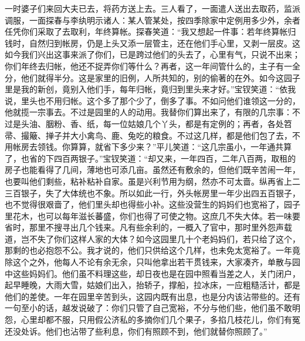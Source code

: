 \begin{parag}
    一时婆子们来回大夫已去，将药方送上去。三人看了，一面遣人送出去取药，监派调服，一面探春与李纨明示诸人：某人管某处，按四季除家中定例用多少外，余者任凭你们采取了去取利，年终算帐。探春笑道：“我又想起一件事：若年终算帐归钱时，自然归到帐房，仍是上头又添一层管主，还在他们手心里，又剥一层皮。这如今我们兴出这事来派了你们，已是跨过他们的头去了，心里有气，只说不出来；你们年终去归帐，他还不捉弄你们等什么？再者，这一年间管什么的，主子有一全分，他们就得半分。这是家里的旧例，人所共知的，别的偷著的在外。如今这园子里是我的新创，竟别入他们手，每年归帐，竟归到里头来才好。”宝钗笑道：“依我说，里头也不用归帐。这个多了那个少了，倒多了事。不如问他们谁领这一分的，他就揽一宗事去。不过是园里的人的动用。我替你们算出来了，有限的几宗事：不过是头油、胭粉、香、纸，每一位姑娘几个丫头，都是有定例的；再者，各处笤帚、撮簸、掸子并大小禽鸟、鹿、兔吃的粮食。不过这几样，都是他们包了去，不用帐房去领钱。你算算，就省下多少来？”平儿笑道：“这几宗虽小，一年通共算了，也省的下四百两银子。”宝钗笑道：“却又来，一年四百，二年八百两，取租的房子也能看得了几间，薄地也可添几亩。虽然还有敷余的，但他们既辛苦闹一年，也要叫他们剩些，粘补粘补自家。虽是兴利节用为纲，然亦不可太啬。纵再省上二三百银子，失了大体统也不象。所以如此一行，外头帐房里一年少出四五百银子，也不觉得很艰啬了，他们里头却也得些小补。这些没营生的妈妈们也宽裕了，园子里花木，也可以每年滋长蕃盛，你们也得了可使之物。这庶几不失大体。若一味要省时，那里不搜寻出几个钱来。凡有些余利的，一概入了官中，那时里外怨声载道，岂不失了你们这样人家的大体？如今这园里几十个老妈妈们，若只给了这个，那剩的也必抱怨不公。我才说的，他们只供给这个几样，也未免太宽裕了。一年竟除这个之外，他每人不论有余无余，只叫他拿出若干贯钱来，大家凑齐，单散与园中这些妈妈们。他们虽不料理这些，却日夜也是在园中照看当差之人，关门闭户，起早睡晚，大雨大雪，姑娘们出入，抬轿子，撑船，拉冰床，一应粗糙活计，都是他们的差使。一年在园里辛苦到头，这园内既有出息，也是分内该沾带些的。还有一句至小的话，越发说破了：你们只管了自己宽裕，不分与他们些，他们虽不敢明怨，心里却都不服，只用假公济私的多摘你们几个果子，多掐几枝花儿，你们有冤还没处诉。他们也沾带了些利息，你们有照顾不到，他们就替你照顾了。”
\end{parag}


